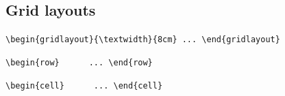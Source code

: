 \documentclass[11pt, a4paper]{article}
\begin{document}
\subsection*{Grid layouts}
\hfill
\lstinline[style=custom-latex]|\begin{gridlayout}{\textwidth}{8cm} ... \end{gridlayout}|

\hfill
\lstinline[style=custom-latex]|\begin{row}{0.5} ... \end{row}|

\hfill
\lstinline[style=custom-latex]|\begin{cell}{0.5} ... \end{cell}|



\end{document}

